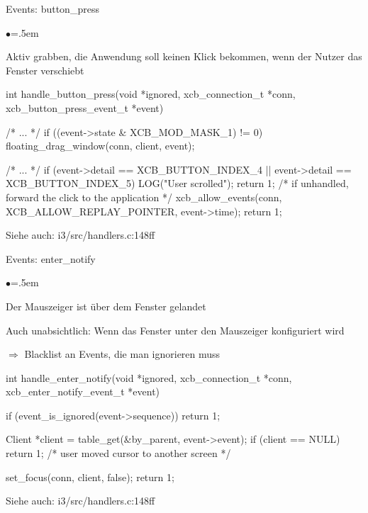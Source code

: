 \documentclass[mode=print,paper=screen,style=jefka]{powerdot}
\newcommand{\isrc}[1]{\begin{center} \footnotesize\ttfamily Siehe auch: #1 \end{center}}
\begin{document}
\begin{slide}[method=direct]{Events: button\_press}
\begin{list}{$\bullet$}{\itemsep=.5em}
        \item Aktiv grabben, die Anwendung soll keinen Klick bekommen, wenn der Nutzer das Fenster verschiebt
\end{list}
\begin{code}
int handle_button_press(void *ignored, xcb_connection_t *conn,
                        xcb_button_press_event_t *event) {
        /* ... */
        if ((event->state & XCB_MOD_MASK_1) != 0)
                floating_drag_window(conn, client, event);

        /* ... */
        if (event->detail == XCB_BUTTON_INDEX_4 ||
            event->detail == XCB_BUTTON_INDEX_5) {
                LOG("User scrolled\n");
                return 1;
        }
        /* if unhandled, forward the click to the application */
        xcb_allow_events(conn, XCB_ALLOW_REPLAY_POINTER, event->time);
        return 1;
}
\end{code}
\isrc{i3/src/handlers.c:148ff}
\end{slide}


\begin{slide}[method=direct]{Events: enter\_notify}
\begin{list}{$\bullet$}{\itemsep=.5em}
        \item Der Mauszeiger ist über dem Fenster gelandet
        \item Auch unabsichtlich: Wenn das Fenster unter den Mauszeiger konfiguriert wird
        \item $\Rightarrow$ Blacklist an Events, die man ignorieren muss
\end{list}

\begin{code}
int handle_enter_notify(void *ignored, xcb_connection_t *conn,
                        xcb_enter_notify_event_t *event) {
        if (event_is_ignored(event->sequence))
                return 1;

        Client *client = table_get(&by_parent, event->event);
        if (client == NULL) {
                return 1; /* user moved cursor to another screen */
        }

        set_focus(conn, client, false);
        return 1;
}
\end{code}
\isrc{i3/src/handlers.c:148ff}
\end{slide}
\end{document}
